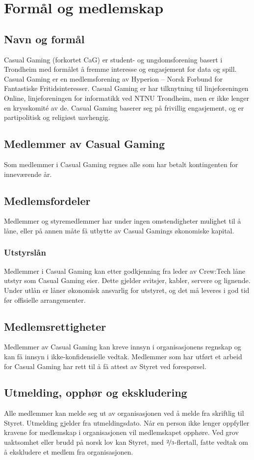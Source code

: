 \chapter{Formål og medlemskap}

\section{Navn og formål}
Casual Gaming (forkortet CaG) er student- og ungdomsforening basert i Trondheim med formålet å fremme interesse og engasjement for data og spill. Casual Gaming er en medlemsforening av Hyperion – Norsk Forbund for Fantastiske Fritidsinteresser. Casual Gaming er har tilknytning til linjeforeningen Online, linjeforeningen for informatikk ved NTNU Trondheim, men er ikke lenger en krysskomité av de. Casual Gaming baserer seg på frivillig engasjement, og er partipolitisk og religiøst uavhengig.

\section{Medlemmer av Casual Gaming}
Som medlemmer i Casual Gaming regnes alle som har betalt kontingenten for inneværende år.

\section{Medlemsfordeler}
Medlemmer og styremedlemmer har under ingen omstendigheter mulighet til å låne, eller på annen måte få utbytte av Casual Gamings økonomiske kapital.

\subsection{Utstyrslån}
Medlemmer i Casual Gaming kan etter godkjenning fra leder av Crew:Tech låne utstyr som Casual Gaming eier. Dette gjelder svitsjer, kabler, servere og lignende. Under utlån er låner økonomisk ansvarlig for utstyret, og det må leveres i god tid før offisielle arrangementer.

\section{Medlemsrettigheter}
Medlemmer av Casual Gaming kan kreve innsyn i organisasjonens regnskap og kan få innsyn i ikke-konfidensielle vedtak. Medlemmer som har utført et arbeid for Casual Gaming har rett til å få attest av Styret ved forespørsel.

\section{Utmelding, opphør og ekskludering}
Alle medlemmer kan melde seg ut av organisasjonen ved å melde fra skriftlig til Styret. Utmelding gjelder fra utmeldingsdato. Når en person ikke lenger oppfyller kravene for medlemskap i organisasjonen vil medlemskapet opphøre. Ved grov uaktsomhet eller brudd på norsk lov kan Styret, med $\nicefrac{2}{3}$-flertall, fatte vedtak om å ekskludere et medlem fra organisasjonen.

